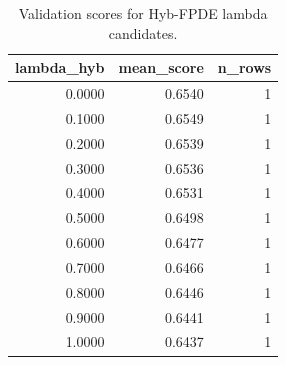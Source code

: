 \begin{table}[t]
\caption{Validation scores for Hyb-FPDE lambda candidates.}
\label{tab:lambda_distribution_computed}
\centering
\begin{tabular}{rrr}
\toprule
lambda\_hyb & mean\_score & n\_rows \\
\midrule
0.0000 & 0.6540 & 1 \\
0.1000 & 0.6549 & 1 \\
0.2000 & 0.6539 & 1 \\
0.3000 & 0.6536 & 1 \\
0.4000 & 0.6531 & 1 \\
0.5000 & 0.6498 & 1 \\
0.6000 & 0.6477 & 1 \\
0.7000 & 0.6466 & 1 \\
0.8000 & 0.6446 & 1 \\
0.9000 & 0.6441 & 1 \\
1.0000 & 0.6437 & 1 \\
\bottomrule
\end{tabular}

\end{table}
